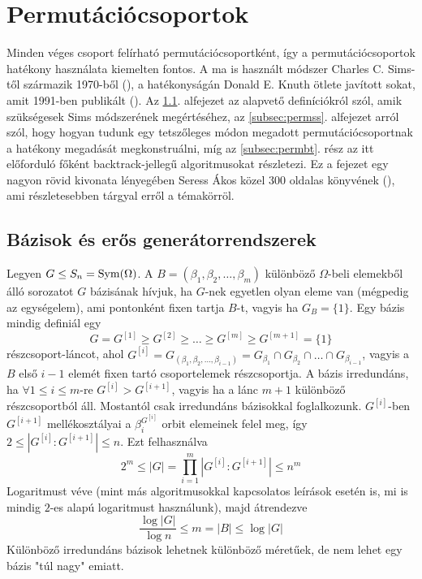 \section{Permutációcsoportok}
\label{sec:permutacio}
Minden véges csoport felírható permutációcsoportként, így a permutációcsoportok hatékony használata kiemelten fontos.
A ma is használt módszer Charles C. Sims-től származik 1970-ből (\cite{Sim70}), a hatékonyságán Donald E. Knuth ötlete javított sokat, amit 1991-ben publikált (\cite{Knu91}).
Az \ref{subsec:permdef}. alfejezet az alapvető definíciókról szól, amik szükségesek Sims módszerének megértéséhez,
az \ref{subsec:permss}. alfejezet arról szól, hogy hogyan tudunk egy tetszőleges módon megadott permutációcsoportnak a hatékony megadását megkonstruálni,
míg az \ref{subsec:permbt}. rész az itt előforduló főként backtrack-jellegű algoritmusokat részletezi.
Ez a fejezet egy nagyon rövid kivonata lényegében Seress Ákos közel 300 oldalas könyvének (\cite{Ser03}), ami részletesebben tárgyal erről a témakörröl.

\subsection{Bázisok és erős generátorrendszerek}
\label{subsec:permdef}
Legyen $G \le S_n = \operatorname{Sym}(\Omega)$.
A $B=(\beta_1,\beta_2,\dots,\beta_m)$ különböző $\Omega$-beli elemekből álló sorozatot $G$ bázisának hívjuk,
ha $G$-nek egyetlen olyan eleme van (mégpedig az egységelem), ami pontonként fixen tartja $B$-t, vagyis ha $G_B=\{1\}$.
Egy bázis mindig definiál egy
\begin{equation}
\label{eq:permlanc}
G = G^{[1]} \ge G^{[2]} \ge \dots \ge G^{[m]} \ge G^{[m+1]} = \{1\}
\end{equation}
részcsoport-láncot, ahol $G^{[i]}=G_{(\beta_1,\beta_2,\dots,\beta_{i-1})}=G_{\beta_1}\cap G_{\beta_2}\cap\dots\cap G_{\beta_{i-1}}$, vagyis a $B$ első $i-1$ elemét fixen tartó csoportelemek részcsoportja.
A bázis irredundáns, ha $\forall 1\le i \le m$-re $G^{[i]} > G^{[i+1]}$, vagyis ha a lánc $m+1$ különböző részcsoportból áll.
Mostantól csak irredundáns bázisokkal foglalkozunk.
$G^{[i]}$-ben $G^{[i+1]}$ mellékosztályai a $\beta_i^{G^{[i]}}$ orbit elemeinek felel meg, így $2 \le \left| G^{[i]} : G^{[i+1]} \right| \le n$.
Ezt felhasználva
\begin{equation}
\label{eq:permmeret}
2^m \le |G|=\prod_{i=1}^m \left| G^{[i]} : G^{[i+1]} \right| \le n^m
\end{equation}
Logaritmust véve (mint más algoritmusokkal kapcsolatos leírások esetén is, mi is mindig $2$-es alapú logaritmust használunk), majd átrendezve
\begin{equation}
\label{eq:permmeret2}
\frac{\log |G|}{\log n} \le m = |B| \le \log |G|
\end{equation}
Különböző irredundáns bázisok lehetnek különböző méretűek, de nem lehet egy bázis "túl nagy" emiatt.

